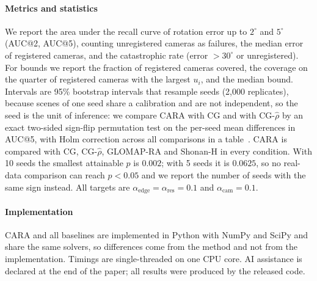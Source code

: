 \paragraph*{Metrics and statistics} We report the area under the recall curve of rotation error up to $2^\circ$ and $5^\circ$ (AUC@2, AUC@5), counting unregistered cameras as failures, the median error of registered cameras, and the catastrophic rate (error $>30^\circ$ or unregistered). For bounds we report the fraction of registered cameras covered, the coverage on the quarter of registered cameras with the largest $u_i$, and the median bound. Intervals are 95\% bootstrap intervals that resample seeds (2,000 replicates), because scenes of one seed share a calibration and are not independent, so the seed is the unit of inference: we compare CARA with CG and with CG-$\hat\rho$ by an exact two-sided sign-flip permutation test on the per-seed mean differences in AUC@5, with Holm correction across all comparisons in a table~\cite{holm1979simple}. CARA is compared with CG, CG-$\hat\rho$, GLOMAP-RA and Shonan-H in every condition. With 10 seeds the smallest attainable $p$ is $0.002$; with 5 seeds it is $0.0625$, so no real-data comparison can reach $p<0.05$ and we report the number of seeds with the same sign instead. All targets are $\alpha_{\mathrm{edge}}=\alpha_{\mathrm{res}}=0.1$ and $\alpha_{\mathrm{cam}}=0.1$.

\paragraph*{Implementation} CARA and all baselines are implemented in Python with NumPy and SciPy and share the same solvers, so differences come from the method and not from the implementation. Timings are single-threaded on one CPU core. AI assistance is declared at the end of the paper; all results were produced by the released code.
